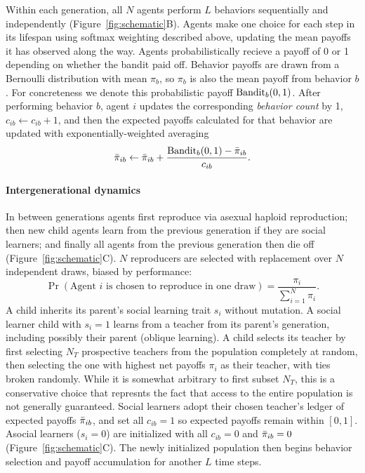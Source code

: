 \documentclass[letterpaper,11.5pt]{scrartcl}
\begin{document}
Within each generation, all $N$ agents perform $L$ behaviors sequentially and
independently (Figure~\ref{fig:schematic}B).
Agents make one choice for each step in its lifespan using softmax weighting
described above, updating the mean payoffs it has observed along the way. 
Agents probabilistically recieve a payoff of 0 or 1 depending on whether the
bandit paid off. Behavior payoffs are drawn from a 
Bernoulli distribution with mean $\pi_b$, so $\pi_b$ is also the mean payoff from
behavior $b$.  For concreteness we denote this probabilistic payoff
$\text{Bandit}_b(0, 1)$. After performing behavior $b$, agent $i$ updates the
corresponding \emph{behavior count} by 1, $c_{ib} \leftarrow c_{ib} + 1$, and then
the expected payoffs calculated for that behavior are updated with
exponentially-weighted averaging
\begin{equation}
  \bar\pi_{ib} \leftarrow \bar\pi_{ib} + \frac{\text{Bandit}_b(0, 1) - \bar\pi_{ib}}{c_{ib}}.
\end{equation}
\noindent


\paragraph{Intergenerational dynamics}
In between generations agents first reproduce via asexual haploid reproduction; 
then new child agents learn from the
previous generation if they are social learners; and finally all agents from the
previous generation then die off (Figure~\ref{fig:schematic}C). 
$N$ reproducers are selected with replacement over $N$ independent draws, 
biased by performance:
\begin{equation}
  \Pr(\text{Agent $i$ is chosen to reproduce in one draw}) = \frac{\pi_i}{\sum_{i=1}^N \pi_i}.
\end{equation}
\noindent
A child inherits its parent's social learning trait $s_i$ without mutation.
A social learner child with $s_i = 1$ learns from a teacher from its parent's
generation, including possibly their parent (oblique learning). 
A child selects its teacher by first selecting $N_T$ prospective
teachers from the population completely at random, then selecting the one with
highest net payoffs $\pi_i$ as their teacher, with ties broken randomly. While it
is somewhat arbitrary to first subset $N_T$, this is a conservative choice that
represnts the fact that access to the entire population is not generally guaranteed.
Social learners adopt their chosen teacher's ledger of expected payoffs $\bar\pi_{ib}$,
and set all $c_{ib} = 1$ so expected payoffs remain within $[0, 1]$.  Asocial
learners ($s_i = 0$) are initialized with all $c_{ib} = 0$ and $\bar\pi_{ib} = 0$ 
(Figure~\ref{fig:schematic}C). The
newly initialized population then begins behavior selection and payoff accumulation
for another $L$ time steps. 
\end{document}
